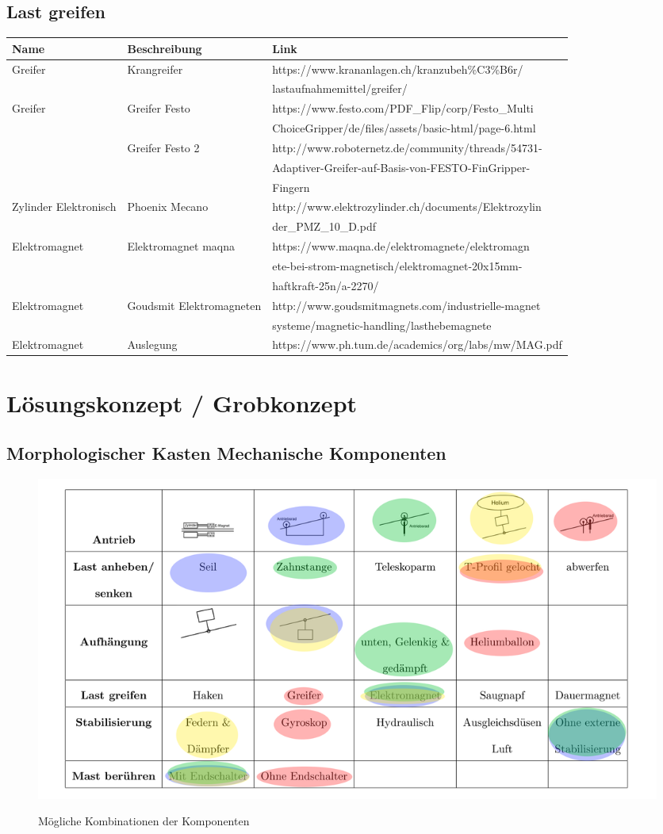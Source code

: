 \documentclass[a4paper]{report}
\begin{document}
\section{Last greifen}
\begin{tabular}{|l|l|l|}
	\hline
	\textbf{Name} & \textbf{Beschreibung} &\textbf{Link}\\
	\hline 
	Greifer& Krangreifer &
	https://www.krananlagen.ch/kranzubeh\%C3\%B6r/\\&&lastaufnahmemittel/greifer/  \\ 
	\hline 
	Greifer & Greifer Festo &https://www.festo.com/PDF\_Flip/corp/Festo\_Multi\\&&ChoiceGripper/de/files/assets/basic-html/page-6.html\\ 
	\hline 
	&Greifer Festo 2&http://www.roboternetz.de/community/threads/54731-\\&&Adaptiver-Greifer-auf-Basis-von-FESTO-FinGripper-\\&&Fingern\\
	\hline
	Zylinder Elektronisch&Phoenix Mecano&http://www.elektrozylinder.ch/documents/Elektrozylin\\&&der\_PMZ\_10\_D.pdf\\
	\hline
	Elektromagnet&Elektromagnet maqna&https://www.maqna.de/elektromagnete/elektromagn\\&&ete-bei-strom-magnetisch/elektromagnet-20x15mm-\\&&haftkraft-25n/a-2270/\\
	\hline
	Elektromagnet&Goudsmit Elektromagneten&http://www.goudsmitmagnets.com/industrielle-magnet\\&&systeme/magnetic-handling/lasthebemagnete\\
	\hline
	Elektromagnet&Auslegung&https://www.ph.tum.de/academics/org/labs/mw/MAG.pdf\\
	\hline
\end{tabular}

\chapter{Lösungskonzept / Grobkonzept}
\section{Morphologischer Kasten Mechanische Komponenten}
\begin{figure}[h!]
	\includegraphics[keepaspectratio,width=\textwidth]{MorphKasten}
	\label{fig:Morphkasten}
	\caption{Mögliche Kombinationen der Komponenten}
\end{figure}
\clearpage
\end{document}
